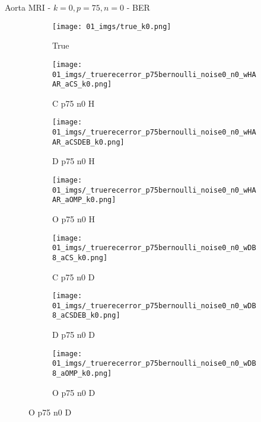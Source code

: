 \begin{frame}{Aorta MRI - $k=0,p=75,n=0$ - BER}{}
\begin{figure}
\begin{subfigure}{0.13\textwidth}
\texttt{[image: 01\_imgs/true\_k0.png]}
\caption*{\tiny True}
\end{subfigure}
\begin{subfigure}{0.13\textwidth}
\texttt{[image: 01\_imgs/\_truerecerror\_p75bernoulli\_noise0\_n0\_wHAAR\_aCS\_k0.png]}
\caption*{\tiny C p75 n0 H}
\end{subfigure}
\begin{subfigure}{0.13\textwidth}
\texttt{[image: 01\_imgs/\_truerecerror\_p75bernoulli\_noise0\_n0\_wHAAR\_aCSDEB\_k0.png]}
\caption*{\tiny D p75 n0 H}
\end{subfigure}
\begin{subfigure}{0.13\textwidth}
\texttt{[image: 01\_imgs/\_truerecerror\_p75bernoulli\_noise0\_n0\_wHAAR\_aOMP\_k0.png]}
\caption*{\tiny O p75 n0 H}
\end{subfigure}
\begin{subfigure}{0.13\textwidth}
\texttt{[image: 01\_imgs/\_truerecerror\_p75bernoulli\_noise0\_n0\_wDB8\_aCS\_k0.png]}
\caption*{\tiny C p75 n0 D}
\end{subfigure}
\begin{subfigure}{0.13\textwidth}
\texttt{[image: 01\_imgs/\_truerecerror\_p75bernoulli\_noise0\_n0\_wDB8\_aCSDEB\_k0.png]}
\caption*{\tiny D p75 n0 D}
\end{subfigure}
\begin{subfigure}{0.13\textwidth}
\texttt{[image: 01\_imgs/\_truerecerror\_p75bernoulli\_noise0\_n0\_wDB8\_aOMP\_k0.png]}
\caption*{\tiny O p75 n0 D}
\end{subfigure}
\end{figure}
\end{frame}

